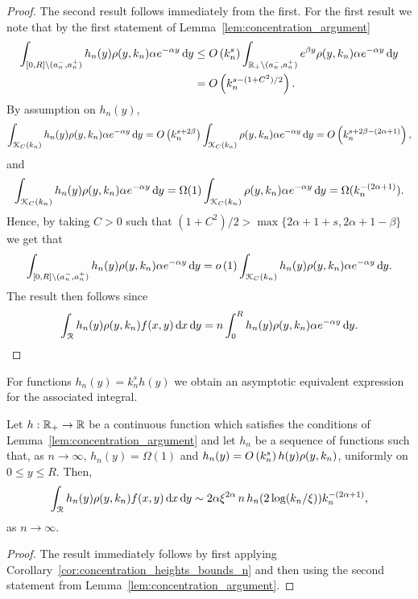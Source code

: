 \begin{proof}
The second result follows immediately from the first. For the first result we note that by the first statement of Lemma~\ref{lem:concentration_argument}
\begin{align*}
	\int_{[0,R] \setminus (a_n^-, a_n^+)} h_n(y) \rho(y,k_n) \alpha e^{-\alpha y} \operatorname{\mathrm{d}\hspace{-2pt}} y
	&\le O\left(k_n^s\right) \int_{{\mathbb R}_+ \setminus (a_n^-, a_n^+)} e^{\beta y } \rho(y,k_n) \alpha e^{-\alpha y} \operatorname{\mathrm{d}\hspace{-2pt}} y\\
	&= O\left(k_n^{s - (1+C^2)/2}\right).
\end{align*}
By assumption on $h_n(y)$,
\[
	\int_{{\mathcal K}_{C}(k_n)} h_n(y) \rho(y,k_n) \alpha e^{-\alpha y} \operatorname{\mathrm{d}\hspace{-2pt}} y 
	= O\left(k_n^{s+2\beta}\right) \int_{{\mathcal K}_{C}(k_n)} \rho(y,k_n) \alpha e^{-\alpha y} \operatorname{\mathrm{d}\hspace{-2pt}} y
	= O\left(k_n^{s+2\beta - (2\alpha + 1)}\right),
\]
and
\[
	\int_{{\mathcal K}_{C}(k_n)} h_n(y) \rho(y,k_n) \alpha e^{-\alpha y} \operatorname{\mathrm{d}\hspace{-2pt}} y 
	= \Omega(1) \int_{{\mathcal K}_{C}(k_n)} \rho(y,k_n) \alpha e^{-\alpha y} \operatorname{\mathrm{d}\hspace{-2pt}} y
	= \Omega(k_n^{-(2\alpha + 1)}).
\]
Hence, by taking $C > 0$ such that $(1+C^2)/2 > \max\{2\alpha + 1 + s, 2\alpha +1 - \beta\}$ we get that
\[
	\int_{[0,R] \setminus (a_n^-, a_n^+)} h_n(y) \rho(y,k_n) \alpha e^{-\alpha y} \operatorname{\mathrm{d}\hspace{-2pt}} y
	= o\left(1\right) \int_{{\mathcal K}_{C}(k_n)} h_n(y) \rho(y,k_n) \alpha e^{-\alpha y} \operatorname{\mathrm{d}\hspace{-2pt}} y.
\]
The result then follows since
\[
	\int_{{\mathcal R}} h_n(y) \rho(y,k_n) f(x,y) \operatorname{\mathrm{d}\hspace{-2pt}} x \operatorname{\mathrm{d}\hspace{-2pt}} y
	= n \int_{0}^{R} h_n(y) \rho(y,k_n) \alpha e^{-\alpha y} \operatorname{\mathrm{d}\hspace{-2pt}} y.
\]
\end{proof}

For functions $h_n(y) = k_n^s h(y)$ we obtain an asymptotic equivalent expression for the associated integral.

\begin{corollary}\label{cor:concentration_heights_asymptotics_n}
Let $h : {\mathbb R}_+ \to {\ensuremath{\mathbb R}}$ be a continuous function which  satisfies the conditions of Lemma~\ref{lem:concentration_argument} and let $h_n$ be a sequence of functions such that, as $n \to \infty$, $h_n(y) = \Omega(1)$ and $h_n(y) = O\left(k_n^{s}\right) h(y)\rho(y,k_n)$, uniformly on $0 \le y \le R$. Then,
\begin{equation}
	\int_{{\mathcal R}} h_n(y) \rho(y,k_n) f(x,y) \operatorname{\mathrm{d}\hspace{-2pt}} x \operatorname{\mathrm{d}\hspace{-2pt}} y 
	\sim 2\alpha \xi^{2\alpha} \, n \, h_n(2\log(k_n/\xi)) k_n^{-(2\alpha + 1)},
\end{equation}
as $n \to \infty$.
\end{corollary}

\begin{proof}
The result immediately follows by first applying Corollary~\ref{cor:concentration_heights_bounds_n} and then using the second statement from Lemma~\ref{lem:concentration_argument}.
\end{proof}

